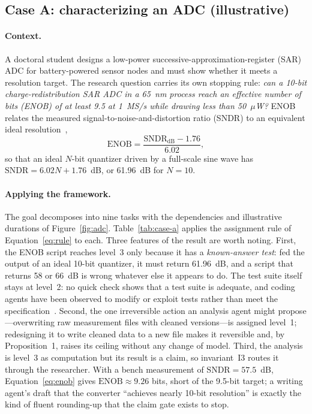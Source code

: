 \subsection{Case A: characterizing an ADC (illustrative)}
\label{sec:case-a}

\paragraph{Context.} A doctoral student designs a low-power successive-approximation-register
(SAR) ADC for battery-powered sensor nodes and must show whether it meets a resolution target.
The research question carries its own stopping rule: \textit{can a 10-bit
charge-redistribution SAR ADC in a 65~nm process reach an effective number of bits
(ENOB) of at least 9.5 at 1~MS/s while drawing less than 50~$\mu$W?} ENOB relates the
measured signal-to-noise-and-distortion ratio (SNDR) to an equivalent ideal
resolution~\cite{ieee1241},
\begin{equation}
  \mathrm{ENOB} = \frac{\mathrm{SNDR}_{\mathrm{dB}} - 1.76}{6.02},
  \label{eq:enob}
\end{equation}
so that an ideal $N$-bit quantizer driven by a full-scale sine wave has
$\mathrm{SNDR}=6.02N+1.76$~dB, or 61.96~dB for $N=10$.

\paragraph{Applying the framework.} The goal decomposes into nine tasks with the
dependencies and illustrative durations of Figure~\ref{fig:adc}. Table~\ref{tab:case-a}
applies the assignment rule of Equation~\eqref{eq:rule} to each. Three features of the
result are worth noting. First, the ENOB script reaches level~3 only because it has a
\emph{known-answer test}: fed the output of an ideal 10-bit quantizer, it must return
61.96~dB, and a script that returns 58 or 66~dB is wrong whatever else it appears to do.
The test suite itself stays at level~2: no quick check shows that a test suite is
adequate, and coding agents have been observed to modify or exploit tests rather than
meet the specification~\cite{zhong2025impossiblebench}. Second, the one irreversible
action an analysis agent might propose---overwriting raw measurement files with cleaned
versions---is assigned level~1; redesigning it to write cleaned data to a new file makes
it reversible and, by Proposition~1, raises its ceiling without any change of model.
Third, the analysis is level~3 as computation but its result is a claim, so invariant~I3
routes it through the researcher. With a bench measurement of $\mathrm{SNDR}=57.5$~dB,
Equation~\eqref{eq:enob} gives $\mathrm{ENOB}\approx9.26$ bits, short of the 9.5-bit
target; a writing agent's draft that the converter ``achieves nearly 10-bit resolution''
is exactly the kind of fluent rounding-up that the claim gate exists to stop.

